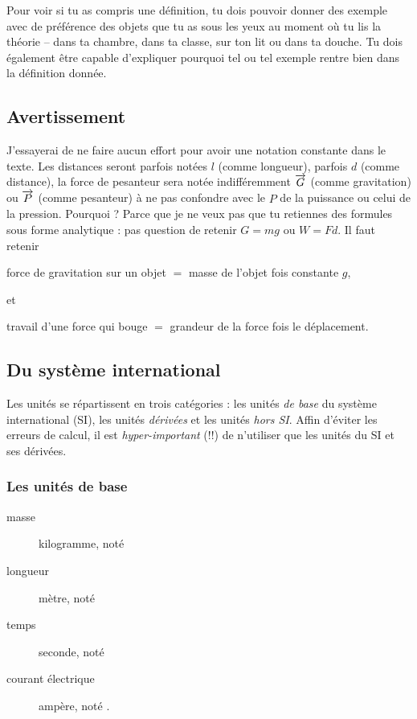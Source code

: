 Pour voir si tu as compris une définition, tu dois pouvoir donner des exemple avec de préférence des objets que tu as sous les yeux au moment où tu lis la théorie -- dans ta chambre, dans ta classe, sur ton lit ou dans ta douche. Tu dois également être capable d'expliquer pourquoi tel ou tel exemple rentre bien dans la définition donnée.

\subsection{Avertissement}

J'essayerai de ne faire aucun effort pour avoir une notation constante dans le texte. Les distances seront parfois notées $l$ (comme longueur), parfois $d$ (comme distance), la force de pesanteur sera notée indifféremment $ \overrightarrow{G}$ (comme gravitation) ou $\overrightarrow{P}$ (comme pesanteur) à ne pas confondre avec le $P$ de la puissance ou celui de la pression. Pourquoi ? Parce que je ne veux pas que tu retiennes des formules sous forme analytique : pas question de retenir $G=mg$ ou $W=Fd$. Il faut retenir
\begin{center}
force de gravitation sur un objet $=$ masse de l'objet fois constante $g$,
\end{center}
et
\begin{center}
travail d'une force qui bouge $=$ grandeur de la force fois le déplacement.
\end{center}


\subsection{Du système international}

Les unités se répartissent en trois catégories : les unités \emph{de base} du système international (SI), les unités \emph{dérivées} et les unités \emph{hors SI}. Affin d'éviter les erreurs de calcul, il est \emph{hyper-important} (!!) de n'utiliser que les unités du SI et ses dérivées.


\subsubsection{Les unités de base}
\begin{description}
\item[masse] kilogramme, noté \kilogram 
\item[longueur] mètre, noté \meter
\item[temps] seconde, noté \second
\item[courant électrique] ampère, noté \ampere.
\end{description}

